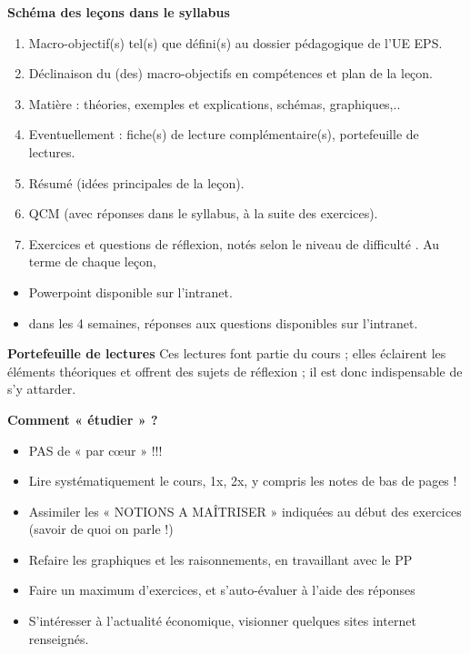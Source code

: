 \documentclass[
]{book}
\providecommand{\tightlist}{%
  \setlength{\itemsep}{0pt}\setlength{\parskip}{0pt}}
\begin{document}
{\textbf{Schéma des leçons dans le syllabus}}

\begin{enumerate}
\def\labelenumi{\arabic{enumi}.}
\tightlist
\item
  Macro-objectif(s) tel(s) que défini(s) au dossier pédagogique de l'UE EPS.
\item
  Déclinaison du (des) macro-objectifs en compétences et plan de la leçon.
\item
  Matière : théories, exemples et explications, schémas, graphiques,..
\item
  Eventuellement : fiche(s) de lecture complémentaire(s), portefeuille de lectures.
\item
  Résumé (idées principales de la leçon).
\item
  QCM (avec réponses dans le syllabus, à la suite des exercices).
\item
  Exercices et questions de réflexion, notés selon le niveau de difficulté .
  Au terme de chaque leçon,
\end{enumerate}

\begin{itemize}
\tightlist
\item
  Powerpoint disponible sur l'intranet.
\item
  dans les 4 semaines, réponses aux questions disponibles sur l'intranet.
\end{itemize}

{\textbf{Portefeuille de lectures}}
Ces lectures font partie du cours ; elles éclairent les éléments théoriques et offrent des sujets de réflexion ; il est
donc indispensable de s'y attarder.

{\textbf{Comment « étudier » ?}}

\begin{itemize}
\tightlist
\item
  PAS de « par cœur » !!!
\item
  Lire systématiquement le cours, 1x, 2x, y compris les notes de bas de pages !
\item
  Assimiler les « NOTIONS A MAÎTRISER » indiquées au début des exercices (savoir de quoi on parle !)
\item
  Refaire les graphiques et les raisonnements, en travaillant avec le PP
\item
  Faire un maximum d'exercices, et s'auto-évaluer à l'aide des réponses
\item
  S'intéresser à l'actualité économique, visionner quelques sites internet renseignés.
\end{itemize}
\end{document}
